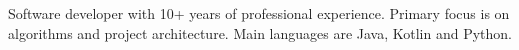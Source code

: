 

\begin{cvparagraph}
	Software developer with 10+ years of professional experience. Primary focus is on algorithms and project architecture. Main languages are Java, Kotlin and Python.
\end{cvparagraph}
